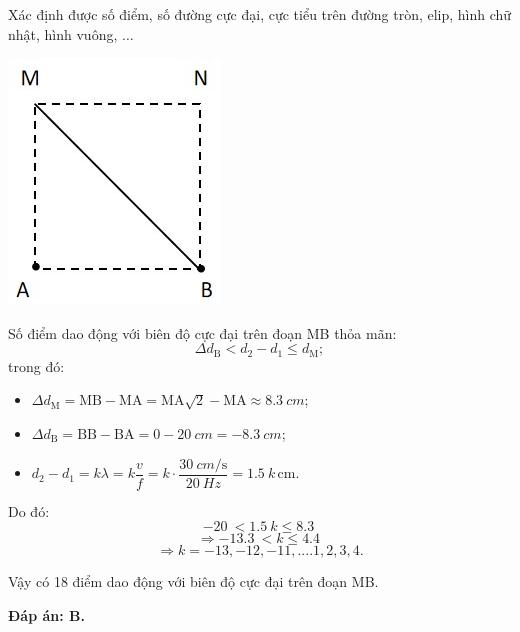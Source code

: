 \begin{dang}{Xác định được số điểm, số đường cực đại, cực tiểu trên đường tròn, elip, hình chữ nhật, hình vuông, $\ldots$}
{\begin{center}
			\vspace*{1em}	
			\includegraphics[scale=0.8]{../figs/VN12-PH-11-A-007-1-V2-4.jpg}
		\end{center}
		
		Số điểm dao động với biên độ cực đại trên đoạn MB thỏa mãn:
		$$\Delta d_\text{B}<{d_2}-{d_1}\le d_\text{M};$$
		trong đó:
		\begin{itemize}
			\item
			$ \Delta d_\text{M}=\text{MB}-\text{MA}=\text{MA}\sqrt{2}-\text{MA}\approx\SI{8.3}{cm}$;
			\item
			$ \Delta d_\text{B}=\text{BB}-\text{BA}=0-\SI{20}{cm}=-\SI{8.3}{cm}$;
			\item
			$d_2-d_1=k\lambda=k\dfrac{v}{f}=k\cdot\dfrac{\SI{30}{cm/\second}}{\SI{20}{Hz}}=\SI{1.5}{}k\,\text{cm}$.
		\end{itemize}
		Do đó:
		$$ -\SI{20}{}<\SI{1.5}{}k\leq \SI{8.3}{}$$ $$\Rightarrow -\SI{13.3}{}<k\leq \SI{4.4}{}$$  $$\Rightarrow k= -13,-12,-11,....1,2,3,4.$$
		
		Vậy có 18 điểm dao động với biên độ cực đại trên đoạn MB.
		
		\textbf{Đáp án: B.}
	}
\end{dang}